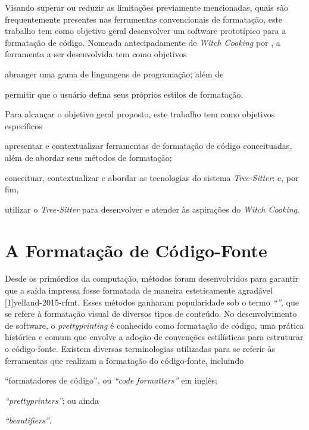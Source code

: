 \documentclass
  [11pt, a4paper, english, openright, sumario = tradicional, twoside, brazil]
  {abntex2}
\begin{document}
  Visando superar ou reduzir as limitações previamente mencionadas, quais são
  frequentemente presentes nas ferramentas convencionais de formatação, este
  trabalho tem como objetivo geral desenvolver um software prototípico para a
  formatação de código. Nomeada antecipadamente de \textit{Witch Cooking}
  por \textcite{silva-2023-witch}, a ferramenta a ser desenvolvida tem como
  objetivos
  \begin{inparaenum}
    \item abranger uma gama de linguagens de programação; além de
    \item permitir que o usuário defina seus próprios estilos de formatação.
  \end{inparaenum}

  Para alcançar o objetivo geral proposto, este trabalho tem como objetivos
  específicos
  \begin{inparaenum}
    \item apresentar e contextualizar ferramentas de formatação de código
          conceituadas, além de abordar seus métodos de formatação;
    \item conceituar, contextualizar e abordar as tecnologias do sistema
          \textit{Tree-Sitter}; e, por fim,
    \item utilizar o \textit{Tree-Sitter} para desenvolver e atender às
          aspirações do \textit{Witch Cooking}.
  \end{inparaenum}


  \chapter{A Formatação de Código-Fonte}

  Desde os primórdios da computação, métodos foram desenvolvidos para garantir
  que a saída impressa fosse formatada de maneira esteticamente agradável
  [1]{yelland-2015-rfmt}. Esses métodos ganharam
  popularidade sob o termo \textit{``''}, que se refere à
  formatação visual de diversos tipos de conteúdo. No desenvolvimento de
  software, o \textit{prettyprinting} é conhecido como formatação de código,
  uma prática histórica e comum que envolve a adoção de convenções estilísticas
  para estruturar o código-fonte. Existem diversas terminologias utilizadas
  para se referir às ferramentas que realizam a formatação do código-fonte,
  incluindo
  \begin{inparaenum}
    \item ``formatadores de código'', ou \textit{``code formatters''} em
          inglês;
    \item \textit{``prettyprinters''}; ou ainda
    \item \textit{``beautifiers''}.
  \end{inparaenum}
\end{document}

